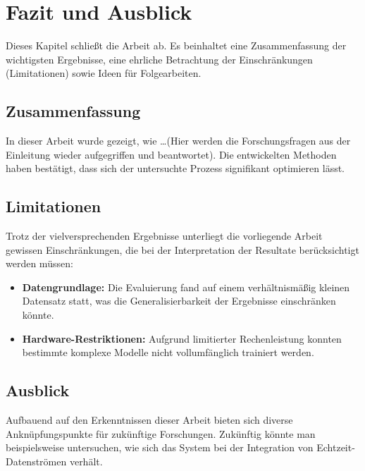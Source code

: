 \chapter{Fazit und Ausblick}
\label{chap:conclusion}

Dieses Kapitel schließt die Arbeit ab. Es beinhaltet eine Zusammenfassung der wichtigsten Ergebnisse, eine ehrliche Betrachtung der Einschränkungen (Limitationen) sowie Ideen für Folgearbeiten.

\section{Zusammenfassung}
In dieser Arbeit wurde gezeigt, wie \dots (Hier werden die Forschungsfragen aus der Einleitung wieder aufgegriffen und beantwortet). Die entwickelten Methoden haben bestätigt, dass sich der untersuchte Prozess signifikant optimieren lässt.

\section{Limitationen}
Trotz der vielversprechenden Ergebnisse unterliegt die vorliegende Arbeit gewissen Einschränkungen, die bei der Interpretation der Resultate berücksichtigt werden müssen:
\begin{itemize}
  \item \textbf{Datengrundlage:} Die Evaluierung fand auf einem verhältnismäßig kleinen Datensatz statt, was die Generalisierbarkeit der Ergebnisse einschränken könnte.
  \item \textbf{Hardware-Restriktionen:} Aufgrund limitierter Rechenleistung konnten bestimmte komplexe Modelle nicht vollumfänglich trainiert werden.
\end{itemize}

\section{Ausblick}
Aufbauend auf den Erkenntnissen dieser Arbeit bieten sich diverse Anknüpfungspunkte für zukünftige Forschungen. Zukünftig könnte man beispielsweise untersuchen, wie sich das System bei der Integration von Echtzeit-Datenströmen verhält.

\clearpage